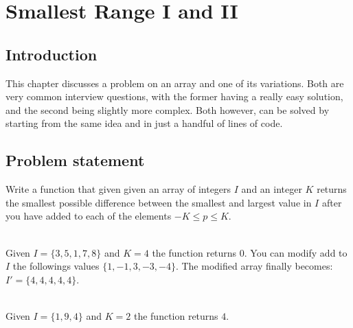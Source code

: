 %



\chapter{Smallest Range \RN{1} and \RN{2}}
\label{ch:smallest_range}
\section*{Introduction}
This chapter discusses a problem on an array and one of its variations. Both are very common
interview questions, with the former having a really easy solution, and the second being slightly
more complex. Both however, can be solved by starting from the same idea and in just a handful of
lines of code.


\section{Problem statement}
\begin{exercise}
\label{example:smallest_range:exercice1}
Write a function that given given an array of integers $I$ and an integer $K$ returns the smallest
possible difference between the smallest and largest value in $I$ after you have added to each of
the elements $-K \leq p \leq K$.

	\begin{example}
		\label{example:smallest_range:example1}
		\hfill \\
		Given $I = \{3,5,1,7,8\}$ and $K=4$ the function returns $0$. You can modify add to $I$ the
		followings values $\{1,-1,3,-3,-4\}$. The modified array finally becomes:
		$I'=\{4,4,4,4,4\}$. 
		
	\end{example}

	\begin{example}
		\label{example:smallest_range:example2}
		\hfill \\
		Given $I = \{1,9,4\}$ and $K=2$ the function returns $4$.
	\end{example}

\end{exercise}

